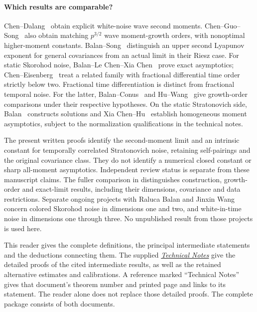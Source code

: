 

\paragraph{Which results are comparable?}
Chen--Dalang~\cite{chen.dalang:15:moment} obtain explicit white-noise wave
second moments. Chen--Guo--Song~\cite{chen.guo.ea:24:moments} also obtain
matching $p^{3/2}$ wave moment-growth orders, with nonoptimal higher-moment
constants. Balan--Song~\cite{balan.song:19:second} distinguish an upper second
Lyapunov exponent for general covariances from an actual limit in their Riesz
case. For static Skorohod noise, Balan--Le Chen--Xia
Chen~\cite{balan.chen.ea:22:exact} prove exact asymptotics;
Chen--Eisenberg~\cite{chen.eisenberg:23:interpolating} treat a related family
with fractional differential time order strictly below two. Fractional time
differentiation is distinct from fractional temporal noise. For the latter,
Balan--Conus~\cite{balan.conus:16:intermittency} and
Hu--Wang~\cite{hu.wang:24:matching} give growth-order comparisons under their
respective hypotheses. On the static Stratonovich side,
Balan~\cite{balan:22:stratonovich} constructs solutions and
Xia Chen--Hu~\cite{chen.hu:25:hyperbolic} establish homogeneous moment
asymptotics, subject to the normalization qualifications in the technical notes.

The present written proofs identify the second-moment limit and an intrinsic
constant for temporally correlated Stratonovich noise, retaining self-pairings
and the original covariance class. They do not identify a numerical closed
constant or sharp all-moment asymptotics. Independent review status is separate
from these manuscript claims. The fuller comparison in  distinguishes
construction, growth-order and exact-limit results, including their dimensions,
covariance and data restrictions.
Separate ongoing projects with Raluca Balan and Jinxin Wang concern colored
Skorohod noise in dimensions one and two, and white-in-time noise in dimensions
one through three. No unpublished result from those projects is used here.

\begin{remark}\label{R:reader-package}
  This reader gives the complete definitions, the principal intermediate
  statements and the deductions connecting them. The supplied
  \href{notes_stratonovich_ham_second_moment.pdf}{\emph{Technical Notes}}
  give the detailed proofs of the cited intermediate results, as well as the
  retained alternative estimates and calibrations. A reference marked
  ``Technical Notes'' gives that document's theorem number and printed page and
  links to its statement. The reader alone does not replace those detailed
  proofs. The complete package consists of both documents.
\end{remark}


